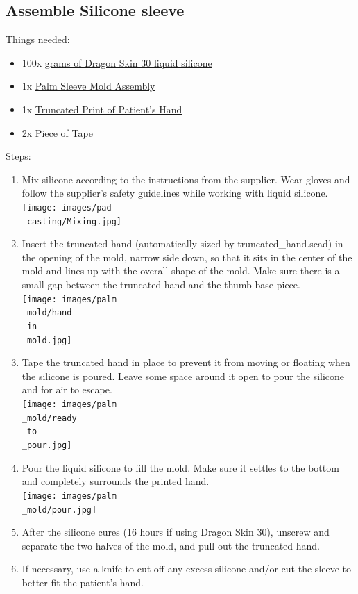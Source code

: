 \documentclass[11pt]{article}
\begin{document}
\subsection{Assemble Silicone sleeve}
Things needed:
\begin{itemize}
\item 100x \hyperlink{thing_g\_dragon\_skin\_30}{grams of Dragon Skin 30 liquid silicone}
\item 1x \hyperlink{thing_mold\_assembly}{Palm Sleeve Mold Assembly}
\item 1x \hyperlink{thing_truncated\_hand}{Truncated Print of Patient's Hand}
\item 2x Piece of Tape
\end{itemize}
Steps:
\begin{enumerate}
\item Mix silicone according to the instructions from the supplier. Wear gloves and follow the supplier's safety guidelines while working with liquid silicone.\\ \texttt{[image: images/pad\\\_casting/Mixing.jpg]}
\item Insert the truncated hand (automatically sized by truncated\_hand.scad) in the opening of the mold, narrow side down, so that it sits in the center of the mold and lines up with the overall shape of the mold. Make sure there is a small gap between the truncated hand and the thumb base piece.\\ \texttt{[image: images/palm\\\_mold/hand\\\_in\\\_mold.jpg]}
\item Tape the truncated hand in place to prevent it from moving or floating when the silicone is poured. Leave some space around it open to pour the silicone and for air to escape.\\ \texttt{[image: images/palm\\\_mold/ready\\\_to\\\_pour.jpg]}
\item Pour the liquid silicone to fill the mold. Make sure it settles to the bottom and completely surrounds the printed hand.\\ \texttt{[image: images/palm\\\_mold/pour.jpg]}
\item After the silicone cures (16 hours if using Dragon Skin 30), unscrew and separate the two halves of the mold, and pull out the truncated hand.
\item If necessary, use a knife to cut off any excess silicone and/or cut the sleeve to better fit the patient's hand.
\end{enumerate}
\end{document}
